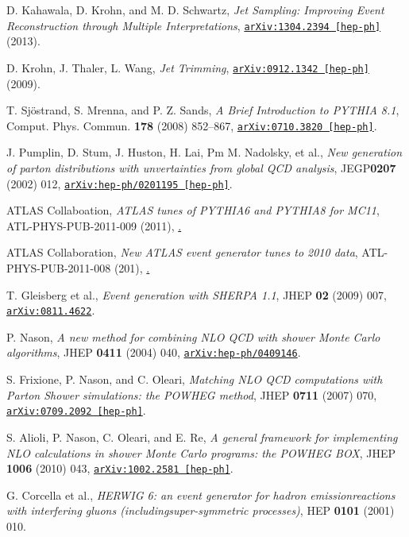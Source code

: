 D. Kahawala, D. Krohn, and M. D. Schwartz, \emph{Jet Sampling: Improving Event Reconstruction through Multiple Interpretations}, \href{http://arxiv.org/abs/1304.2394}{\texttt{arXiv:1304.2394 [hep-ph]}} (2013).

D. Krohn, J. Thaler, L. Wang, \emph{Jet Trimming}, \href{http://arxiv.org/abs/0912.1342}{\texttt{arXiv:0912.1342 [hep-ph]}} (2009).

T. Sj\"ostrand, S. Mrenna, and P. Z. Sands, \emph{A Brief Introduction to PYTHIA 8.1}, Comput. Phys. Commun. \textbf{178} (2008) 852--867, \href{http://arxiv.org/abs/0710.3820}{\texttt{arXiv:0710.3820 [hep-ph]}}.

J. Pumplin, D. Stum, J. Huston, H. Lai, Pm M. Nadolsky, et al., \emph{New generation of parton distributions with unvertainties from global QCD analysis}, JEGP\textbf{0207} (2002) 012, \href{http://arxiv.org/abs/hep-ph/0201195}{\texttt{arXiv:hep-ph/0201195 [hep-ph]}}.

ATLAS Collaboation, \emph{ATLAS tunes of PYTHIA6 and PYTHIA8 for MC11}, ATL-PHYS-PUB-2011-009 (2011), \href{http://cdsweb.cern.ch/record/1363300}.

ATLAS Collaboration, \emph{New ATLAS event generator tunes to 2010 data}, ATL-PHYS-PUB-2011-008 (201), \href{https://cdsweb.cern.ch/record/1345343}.

T. Gleisberg et al., \emph{Event generation with SHERPA 1.1}, JHEP \textbf{02} (2009) 007, \href{http://arxiv.org/abs/0811.4622}{\texttt{arXiv:0811.4622}}.

P. Nason, \emph{A new method for combining NLO QCD with shower Monte Carlo algorithms}, JHEP \textbf{0411} (2004) 040, \newblock \href{http://arxiv.org/abs/hep-ph/0409146}{\texttt{arXiv:hep-ph/0409146}}.

S. Frixione, P. Nason, and C. Oleari, \emph{Matching NLO QCD computations with Parton Shower simulations: the POWHEG method}, JHEP \textbf{0711} (2007) 070, \href{http://arxiv.org/abs/0709.2092}{\texttt{arXiv:0709.2092 [hep-ph]}}.

S. Alioli, P. Nason, C. Oleari, and E. Re, \emph{A general framework for implementing NLO calculations in shower Monte Carlo programs: the POWHEG BOX}, JHEP \textbf{1006} (2010) 043, \href{http://arxiv.org/abs/1002.2581}{\texttt{arXiv:1002.2581 [hep-ph]}}.

G. Corcella et al., \emph{HERWIG 6: an event generator for hadron emissionreactions with interfering gluons (includingsuper-symmetric processes)}, HEP \textbf{0101} (2001) 010.

